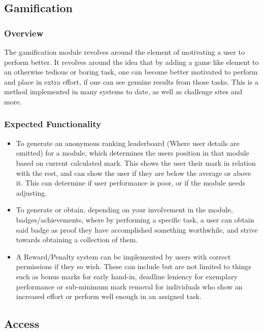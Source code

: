 \documentclass[12pt]{article}
\begin{document}
	\pagebreak
	
	\subsection{Gamification}
	
		\subsubsection{Overview}
		
		The gamification module revolves around the element of motivating a user to perform better. It revolves around the idea that by adding a game like element to an otherwise tedious or boring task, one can become better motivated to perform and place in extra effort, if one can see genuine results from those tasks. This is a method implemented in many systems to date, as well as challenge sites and more.
		
		\subsubsection{Expected Functionality}
		
		\begin{itemize}
			\item To generate an anonymous ranking leaderboard (Where user details are omitted) for a module, which determines the users position in that module based on current calculated mark. This shows the user their mark in relation with the rest, and can show the user if they are below the average or above it. This can determine if user performance is poor, or if the module needs adjusting.
			\item To generate or obtain, depending on your involvement in the module, badges/achievements, where by performing a specific task, a user can obtain said badge as proof they have accomplished something worthwhile, and strive towards obtaining a collection of them. 
			\item A Reward/Penalty system can be implemented by users with correct permissions if they so wish. These can include but are not limited to things such as bonus marks for early hand-in, deadline leniency for exemplary performance or sub-minimum mark removal for individuals who show an increased effort or perform well enough in an assigned task.
		\end{itemize}
	
	\pagebreak
	
	\subsection{Access}
	
\end{document}
